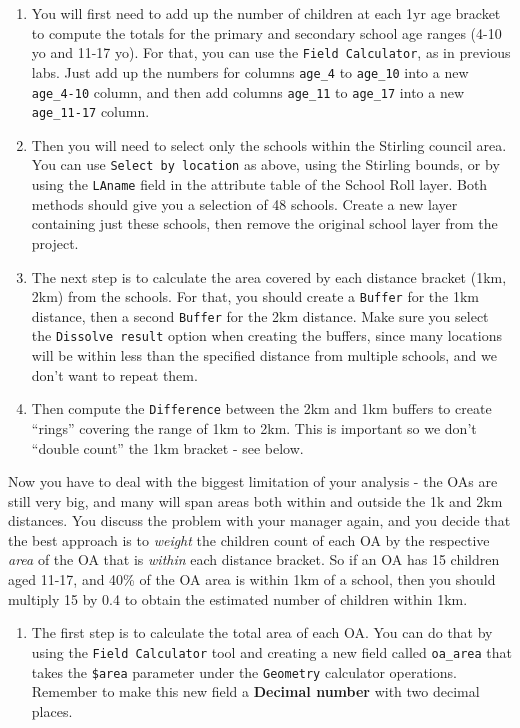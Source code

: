 \documentclass[
  letterpaper,
  DIV=11,
  numbers=noendperiod]{scrreprt}
\providecommand{\tightlist}{%
  \setlength{\itemsep}{0pt}\setlength{\parskip}{0pt}}\usepackage{longtable,booktabs,array}
\begin{document}
\begin{enumerate}
\def\labelenumi{(\arabic{enumi})}
\setcounter{enumi}{295}
\item
  You will first need to add up the number of children at each 1yr age
  bracket to compute the totals for the primary and secondary school age
  ranges (4-10 yo and 11-17 yo). For that, you can use the
  \texttt{Field\ Calculator}, as in previous labs. Just add up the
  numbers for columns \texttt{age\_4} to \texttt{age\_10} into a new
  \texttt{age\_4-10} column, and then add columns \texttt{age\_11} to
  \texttt{age\_17} into a new \texttt{age\_11-17} column.
\item
  Then you will need to select only the schools within the Stirling
  council area. You can use \texttt{Select\ by\ location} as above,
  using the Stirling bounds, or by using the \texttt{LAname} field in
  the attribute table of the School Roll layer. Both methods should give
  you a selection of 48 schools. Create a new layer containing just
  these schools, then remove the original school layer from the project.
\item
  The next step is to calculate the area covered by each distance
  bracket (1km, 2km) from the schools. For that, you should create a
  \texttt{Buffer} for the 1km distance, then a second \texttt{Buffer}
  for the 2km distance. Make sure you select the
  \texttt{Dissolve\ result} option when creating the buffers, since many
  locations will be within less than the specified distance from
  multiple schools, and we don't want to repeat them.
\item
  Then compute the \texttt{Difference} between the 2km and 1km buffers
  to create ``rings'' covering the range of 1km to 2km. This is
  important so we don't ``double count'' the 1km bracket - see below.
\end{enumerate}

Now you have to deal with the biggest limitation of your analysis - the
OAs are still very big, and many will span areas both within and outside
the 1k and 2km distances. You discuss the problem with your manager
again, and you decide that the best approach is to \emph{weight} the
children count of each OA by the respective \emph{area} of the OA that
is \emph{within} each distance bracket. So if an OA has 15 children aged
11-17, and 40\% of the OA area is within 1km of a school, then you
should multiply 15 by 0.4 to obtain the estimated number of children
within 1km.

\begin{enumerate}
\def\labelenumi{(\arabic{enumi})}
\setcounter{enumi}{299}
\tightlist
\item
  The first step is to calculate the total area of each OA. You can do
  that by using the \texttt{Field\ Calculator} tool and creating a new
  field called \texttt{oa\_area} that takes the \texttt{\$area}
  parameter under the \texttt{Geometry} calculator operations. Remember
  to make this new field a \textbf{Decimal number} with two decimal
  places.
\end{enumerate}
\end{document}
